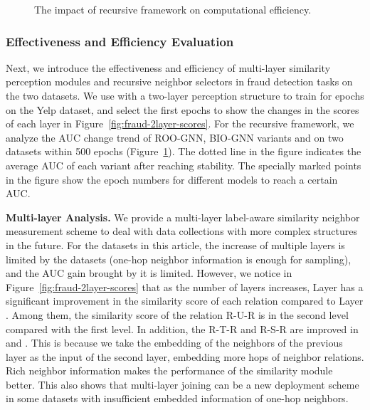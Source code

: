 \begin{figure}[t]
\centering
{}

\centering
\caption{The impact of recursive framework on computational efficiency.}\label{fig:fraud-efficiency}
\end{figure}


\subsubsection{Effectiveness and Efficiency Evaluation}\label{sec:fraud-efficiency}
Next, we introduce the effectiveness and efficiency of multi-layer similarity perception modules and recursive neighbor selectors in fraud detection tasks on the two datasets.
We use \RioGNN with a two-layer perception structure to train for  epochs on the Yelp dataset, and select the first  epochs to show the changes in the scores of each layer in Figure~\ref{fig:fraud-2layer-scores}.
For the recursive framework, we analyze the AUC change trend of ROO-GNN, BIO-GNN variants and \RioGNN on two datasets within 500 epochs (Figure~\ref{fig:fraud-efficiency}).
The dotted line in the figure indicates the average AUC of each variant after reaching stability.
The specially marked points in the figure show the epoch numbers for different models to reach a certain AUC.

\textbf{Multi-layer Analysis.}
We provide a multi-layer label-aware similarity neighbor measurement scheme to deal with data collections with more complex structures in the future. 
For the datasets in this article, the increase of multiple layers is limited by the datasets (one-hop neighbor information is enough for sampling), and the AUC gain brought by it is limited. 
However, we notice in Figure~\ref{fig:fraud-2layer-scores} that as the number of layers increases, Layer  has a significant improvement in the similarity score of each relation compared to Layer . 
Among them, the similarity score of the relation R-U-R is  in the second level compared with the first level. 
In addition, the R-T-R and R-S-R are improved in  and .
This is because we take the embedding of the neighbors of the previous layer as the input of the second layer, embedding more hops of neighbor relations. 
Rich neighbor information makes the performance of the similarity module better. This also shows that multi-layer joining can be a new deployment scheme in some datasets with insufficient embedded information of one-hop neighbors.

